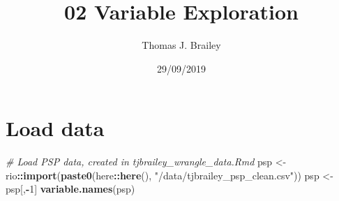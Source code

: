 \documentclass[
]{article}
\title{02 Variable Exploration}
\author{Thomas J. Brailey}
\date{29/09/2019}
\newenvironment{Shaded}{\begin{snugshade}}{\end{snugshade}}
\newcommand{\CommentTok}[1]{\textcolor[rgb]{0.56,0.35,0.01}{\textit{#1}}}
\newcommand{\DecValTok}[1]{\textcolor[rgb]{0.00,0.00,0.81}{#1}}
\newcommand{\KeywordTok}[1]{\textcolor[rgb]{0.13,0.29,0.53}{\textbf{#1}}}
\newcommand{\NormalTok}[1]{#1}
\newcommand{\OperatorTok}[1]{\textcolor[rgb]{0.81,0.36,0.00}{\textbf{#1}}}
\newcommand{\StringTok}[1]{\textcolor[rgb]{0.31,0.60,0.02}{#1}}
\begin{document}
\maketitle

{
\setcounter{tocdepth}{2}
\tableofcontents
}
\hypertarget{load-data}{%
\section{Load data}\label{load-data}}

\begin{Shaded}
\begin{Highlighting}[]
\CommentTok{# Load PSP data, created in tjbrailey_wrangle_data.Rmd}
\NormalTok{psp <-}\StringTok{ }\NormalTok{rio}\OperatorTok{::}\KeywordTok{import}\NormalTok{(}\KeywordTok{paste0}\NormalTok{(here}\OperatorTok{::}\KeywordTok{here}\NormalTok{(), }\StringTok{"/data/tjbrailey_psp_clean.csv"}\NormalTok{))}
\NormalTok{psp <-}\StringTok{ }\NormalTok{psp[,}\OperatorTok{-}\DecValTok{1}\NormalTok{]}
\KeywordTok{variable.names}\NormalTok{(psp)}
\end{Highlighting}
\end{Shaded}
\end{document}
